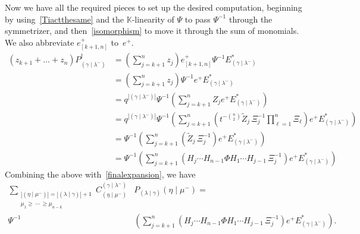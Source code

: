 \documentclass[11pt]{article}
\theoremstyle{definition}
\numberwithin{equation}{section}
\newcommand{\Lq}{\mathbb{K}}
\newcommand{\ZZ}{\widetilde{Z}}
\newcommand{\ep}{e^+}
\newcommand{\eplusB}{e^+_{[k+1,n]}}
\newcommand{\Estar}[1]{E^*_{#1}}
\newcommand{\PB}[1]{P_{#1}^\dagger}
\newcommand{\PP}{P_{(\lambda \mid \gamma)}}
\newcommand{\nudom}{{( \lambda \mid \gamma )}}
\newcommand{\lambdagamma}{{\nudom}}
\newcommand{\gammalambdamin}{{(\gamma \mid \lambda^-)}}
\newcommand{\etamu}{{(\eta \mid \mu^-)}}
\begin{document}
Now we have all the required pieces to set up the desired computation, beginning by using~\eqref{Tiactthesame} and the $\Lq$-linearity of $\Psi$ to pass $\Psi^{-1}$ through the symmetrizer, and then~\eqref{isomorphism} to move it through the sum of monomials. We also abbreviate $\eplusB$ to~$\ep$.
\begin{align*}
    (z_{k+1} + \dots + z_n) \PB{\gammalambdamin} &=  \left(\sum_{j=k+1}^n z_j \right) \eplusB \Psi^{-1} \Estar{\gammalambdamin}\\
     &=  \left(\sum_{j=k+1}^n z_j \right) \Psi^{-1} \ep \Estar{\gammalambdamin}\\
    &= q^{|\gammalambdamin|} \Psi^{-1} \left( \sum_{j=k+1}^n Z_j \ep \Estar{\gammalambdamin}\right)\\
    &= q^{|\gammalambdamin|}\Psi^{-1}  \left( \sum_{j=k+1}^n \left( t^{-\binom{n}{2}} \ZZ_j\, \Xi_j^{-1} \prod_{\ell=1}^n \Xi_\ell \right) \ep \Estar{\gammalambdamin}\right)\\
    &= \Psi^{-1} \left( \sum_{j=k+1}^n \left( \ZZ_j\, \Xi_j^{-1} \right) \ep \Estar{\gammalambdamin}\right)\\
    &= \Psi^{-1} \left( \sum_{j=k+1}^n \left( H_j \dotsm H_{n-1} \Phi H_1 \dotsm H_{j-1} \, \Xi_j^{-1} \right) \ep \Estar{\gammalambdamin}\right)   \end{align*}
Combining the above with~\eqref{finalexpansion}, we have
\begin{align*} \sum_{\substack{|\etamu| = |\lambdagamma| + 1 \\ \mu_1 \geq \, \dotsm \, \geq \mu_{n-k}}}  C^{\gammalambdamin}_{\etamu} &\PP{\etamu} = \\ \Psi^{-1} &\left( \sum_{j=k+1}^n \left( H_j \dotsm H_{n-1} \Phi H_1 \dotsm H_{j-1} \, \Xi_j^{-1} \right) \ep \Estar{\gammalambdamin}\right). \end{align*}
\end{document}

